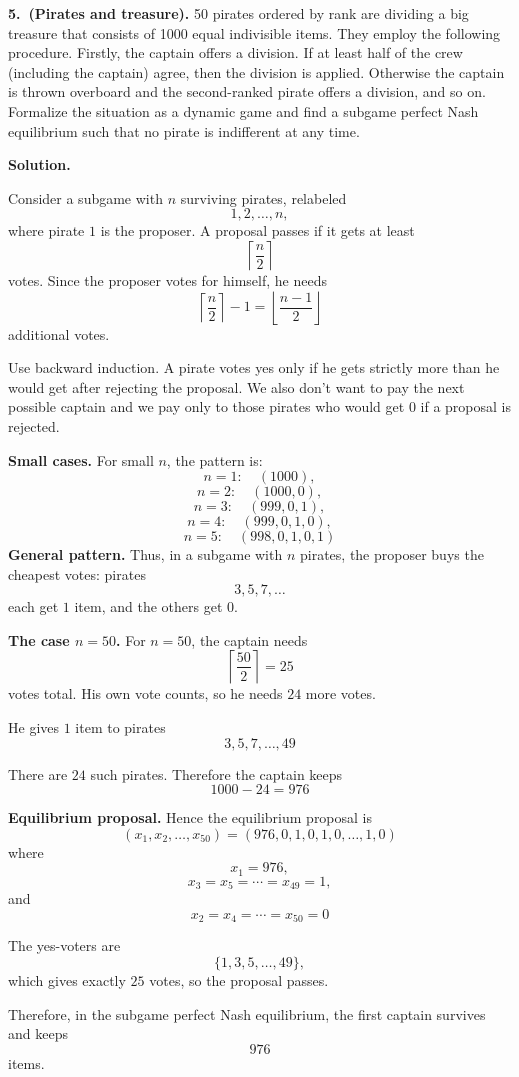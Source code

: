 \textbf{5.\ (Pirates and treasure).}
50 pirates ordered by rank are dividing a big treasure that consists of 1000
equal indivisible items. They employ the following procedure. Firstly, the
captain offers a division. If at least half of the crew (including the captain)
agree, then the division is applied. Otherwise the captain is thrown overboard
and the second-ranked pirate offers a division, and so on. Formalize the
situation as a dynamic game and find a subgame perfect Nash equilibrium such
that no pirate is indifferent at any time.

\textbf{Solution.}

Consider a subgame with \(n\) surviving pirates, relabeled
\[
1,2,\dots,n,
\]
where pirate \(1\) is the proposer. A proposal passes if it gets at least
\[
\left\lceil \frac n2 \right\rceil
\]
votes. Since the proposer votes for himself, he needs
\[
\left\lceil \frac n2 \right\rceil -1
=
\left\lfloor \frac{n-1}{2}\right\rfloor
\]
additional votes.

Use backward induction. A pirate votes yes only if he gets strictly more than
he would get after rejecting the proposal. We also don't want to pay the next possible captain and we pay only to those pirates
who would get 0 if a proposal is rejected.

\medskip
\noindent\textbf{Small cases.}
For small \(n\), the pattern is:
\[
n=1:\quad (1000),
\]
\[
n=2:\quad (1000,0),
\]
\[
n=3:\quad (999,0,1),
\]
\[
n=4:\quad (999,0,1,0),
\]
\[
n=5:\quad (998,0,1,0,1)
\]
\medskip
\noindent\textbf{General pattern.}
Thus, in a subgame with \(n\) pirates, the proposer buys the cheapest votes:
pirates
\[
3,5,7,\dots
\]
each get \(1\) item, and the others get \(0\).

\medskip
\noindent\textbf{The case \(n=50\).}
For \(n=50\), the captain needs
\[
\left\lceil \frac{50}{2}\right\rceil =25
\]
votes total. His own vote counts, so he needs \(24\) more votes.

He gives \(1\) item to pirates
\[
3,5,7,\dots,49
\]

There are \(24\) such pirates. Therefore the captain keeps
\[
1000-24=976
\]

\medskip
\noindent\textbf{Equilibrium proposal.}
Hence the equilibrium proposal is
\[
(x_1,x_2,\dots,x_{50})
=
(976,0,1,0,1,0,\dots,1,0)
\]
where
\[
x_1=976,
\]
\[
x_{3}=x_{5}=\cdots=x_{49}=1,
\]
and
\[
x_2=x_4=\cdots=x_{50}=0
\]

The yes-voters are
\[
\{1,3,5,\dots,49\},
\]
which gives exactly \(25\) votes, so the proposal passes.

Therefore, in the subgame perfect Nash equilibrium, the first captain survives
and keeps
\[
976
\]
items.
